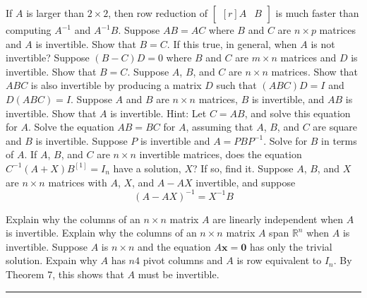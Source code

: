 \documentclass[11pt,answers]{exam} %
\renewcommand{\vec}[1]{\mathbf{#1}}
\newcommand{\mat}[1]{\begin{bmatrix*}[r] #1 \end{bmatrix*}}
\begin{document}
\begin{questions}
    If $A$ is larger than $2 \times 2$, then row reduction of $\mat{A & B}$ is much faster than computing $A^{-1}$ and $A^{-1}B$.
    \question Suppose $AB = AC$ where $B$ and $C$ are $n \times p$ matrices and $A$ is invertible. Show that $B = C$. If this true, in general, when $A$ is not invertible?
    \question Suppose $\left(B-C\right)D = 0$ where $B$ and $C$ are $m \times n$ matrices and $D$ is invertible. Show that $B = C$.
    \question Suppose $A$, $B$, and $C$ are $n \times n$ matrices. Show that $ABC$ is also invertible by producing a matrix $D$ such that $(ABC)D = I$ and $D(ABC) = I$.
    \question Suppose $A$ and $B$ are $n \times n$ matrices, $B$ is invertible, and $AB$ is invertible. Show that $A$ is invertible. Hint: Let $C = AB$, and solve this equation for $A$.
    \question Solve the equation $AB = BC$ for $A$, assuming that $A$, $B$, and $C$ are square and $B$ is invertible.
    \question Suppose $P$ is invertible and $A = PBP^{-1}$. Solve for $B$ in terms of $A$.
    \question If $A$, $B$, and $C$ are $n \times n$ invertible matrices, does the equation $C^{-1}(A+X)B^{[1]} = I_n$ have a solution, $X$? If so, find it.
    \question Suppose $A$, $B$, and $X$ are $n \times n$ matrices with $A$, $X$, and $A-AX$ invertible, and suppose
    \begin{equation*}
        \left(A - AX\right)^{-1} = X^{-1}B
    \end{equation*}
    \question Explain why the columns of an $n \times n$ matrix $A$ are linearly independent when $A$ is invertible.
    \question Explain why the columns of an $n \times n$ matrix $A$ span $\mathbb{R}^n$ when $A$ is invertible.
    \question Suppose $A$ is $n \times n$  and the equation $A\vec{x} = \vec{0}$ has only the trivial solution. Expain why $A$ has $n4$ pivot columns and $A$ is row equivalent to $I_n$. By Theorem 7, this shows that $A$ must be invertible.
    

    \begin{center}\rule{4in}{0.1mm}\end{center}


\end{questions} 
\end{document}
